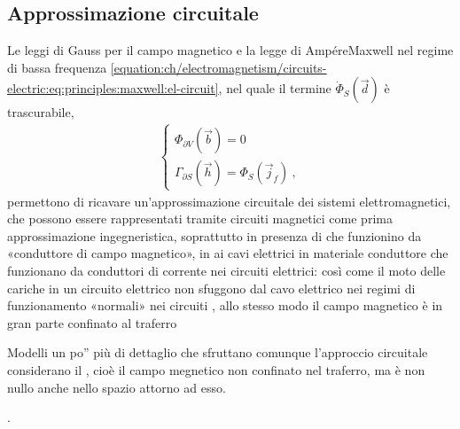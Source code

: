 \documentclass[letterpaper,10pt,italian]{jupyterBook}
\begin{document}
\subsection{Approssimazione circuitale}
\label{\detokenize{ch/electromagnetism/circuits-magnetic:approssimazione-circuitale}}\label{\detokenize{ch/electromagnetism/circuits-magnetic:physics-hs-electromagnetism-circuits-magnetic-approx}}
\sphinxAtStartPar
Le leggi di Gauss per il campo magnetico e la legge di Ampére\sphinxhyphen{}Maxwell nel regime di bassa frequenza \eqref{equation:ch/electromagnetism/circuits-electric:eq:principles:maxwell:el-circuit}, nel quale il termine \(\dot{\Phi}_S(\vec{d})\) è trascurabile,
\begin{equation}\label{equation:ch/electromagnetism/circuits-magnetic:eq:principles:maxwell:mag-circuit}
\begin{split}\begin{cases}
  \Phi_{\partial V}(\vec{b}) = 0 \\
  \Gamma_{\partial S}(\vec{h}) = \Phi_S(\vec{j}_f) \ ,
\end{cases}\end{split}
\end{equation}
\sphinxAtStartPar
permettono di ricavare un’approssimazione circuitale dei sistemi elettromagnetici, che possono essere rappresentati tramite circuiti magnetici come prima approssimazione ingegneristica, soprattutto in presenza di  che funzionino da «conduttore di campo magnetico», in  ai cavi elettrici in materiale conduttore che funzionano da conduttori di corrente nei circuiti elettrici: così come il moto delle cariche in un circuito elettrico non sfuggono dal cavo elettrico \sphinxhyphen{} nei regimi di funzionamento «normali» nei circuiti \sphinxhyphen{}, allo stesso modo il campo magnetico è in gran parte confinato al traferro%
\begin{footnote}[1]\sphinxAtStartFootnote
Modelli un po” più di dettaglio che sfruttano comunque l’approccio circuitale considerano il , cioè il campo megnetico non confinato nel traferro, ma è non nullo anche nello spazio attorno ad esso.
%
\end{footnote}.
\end{document}
